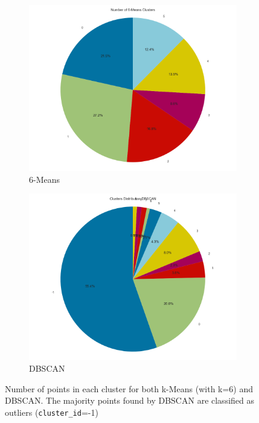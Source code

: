 \documentclass[a4paper,11pt]{article}
\begin{document}
\begin{figure}
    \centering
    \begin{subfigure}{0.49\linewidth}
        \includegraphics[width=\linewidth]{figures/clustering/6-means_pie.png}
    \caption{6-Means}
    \label{fig:pie_kmeans}
    \end{subfigure}
    \begin{subfigure}{0.5\linewidth}
        \includegraphics[width=\linewidth]{figures/clustering/dbscan_pie.png}
    \caption{DBSCAN}
    \label{fig:pie_dbscan}
    \end{subfigure}
    \caption{Number of points in each cluster for both k-Means (with k=6) and DBSCAN. The majority points found by DBSCAN are classified as outliers (\texttt{cluster\_id}=-1)}
    \end{figure}
\end{document}
